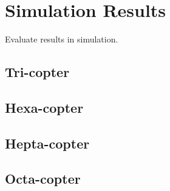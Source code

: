 \chapter{Simulation Results}
\label{sec:simulation_results}
Evaluate results in simulation.

\section{Tri-copter}
\label{sec:tri_copter_sim}

\section{Hexa-copter}
\label{sec:hexa_copter_sim}

\section{Hepta-copter}
\label{sec:hepta_copter_sim}

\section{Octa-copter}
\label{sec:octa_copter_sim}
